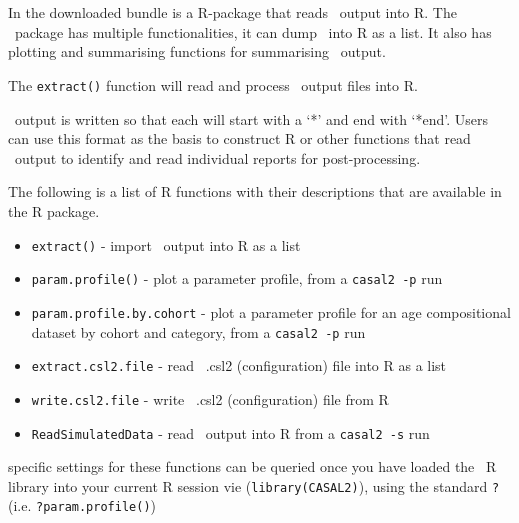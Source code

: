 \section{ \label{sec:post-processing}}

In the downloaded bundle is a R-package that reads \CNAME\ output into R. The \CNAME\ package has multiple functionalities, it can dump \CNAME\ into R as a list. It also has plotting and summarising functions for summarising \CNAME\ output.

The \texttt{extract()} function will read and process \CNAME\ output files into R. 

\CNAME\ output is written so that each  will start with a `*' and end with `*end'. Users can use this format as the basis to construct R or other functions that read \CNAME\ output to identify and read individual reports for post-processing.


The following is a list of R functions with their descriptions that are available in the R package.

\begin{itemize}
	\item \texttt{extract()} - import \CNAME\ output into R as a list
	\item \texttt{param.profile()} - plot a parameter profile, from a \texttt{casal2 -p} run
	\item \texttt{param.profile.by.cohort} - plot a parameter profile for an age compositional dataset by cohort and category, from a \texttt{casal2 -p} run
	\item \texttt{extract.csl2.file} - read \CNAME\ .csl2 (configuration) file into R as a list
	\item \texttt{write.csl2.file} - write \CNAME\ .csl2 (configuration) file from R
	\item \texttt{ReadSimulatedData} - read \CNAME\ output into R from a \texttt{casal2 -s} run		
\end{itemize}


specific settings for these functions can be queried once you have loaded the \CNAME\ R library into your current R session vie (\texttt{library(CASAL2)}), using the standard \texttt{?} (i.e. \texttt{?param.profile()})